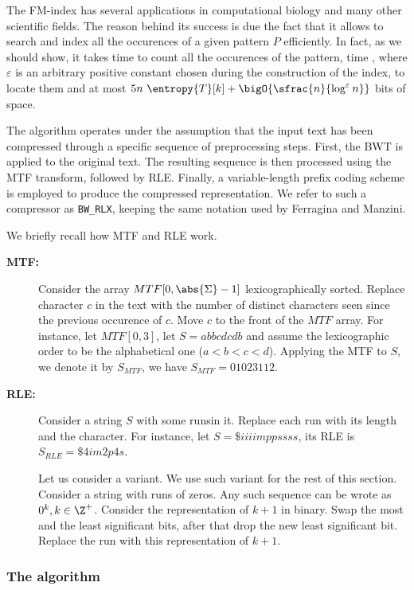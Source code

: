 \documentclass{subfiles}
\begin{document}
    The FM-index has several applications in computational biology and many other scientific fields.
        The reason behind its success is due the fact that it allows to search and index 
        all the occurences of a given pattern \(P\) efficiently. In fact, as we should show, 
        it takes time  to count all the occurences of the pattern, 
        time , where \(\varepsilon\) is an arbitrary positive constant chosen 
        during the construction of the index, to locate them and at most 
        \(5n \ \entropy{T}[k] + \bigO{\sfrac{n}{\log^{\varepsilon} n}}\) bits of space.

    The algorithm operates under the assumption that the input text has been compressed through 
        a specific sequence of preprocessing steps. First, the BWT is applied to the original text.
        The resulting sequence is then processed using the MTF transform, followed by RLE. 
        Finally, a variable-length prefix coding scheme is employed to produce the compressed representation.
        We refer to such a compressor as \lstinline{BW_RLX}, keeping the same notation used by Ferragina and Manzini.

    We briefly recall how MTF and RLE work.
    \begin{description}
        \item [\textbf{MTF:}] Consider the array \(MTF[0, \abs{\Sigma} - 1]\) lexicographically sorted. 
            Replace character \(c\) in the text with the number of distinct characters seen since the previous occurence of \(c\).
            Move \(c\) to the front of the \(MTF\) array.
            For instance, let \(MTF[0, 3]\), let \(S = abbcdcdb\) and assume the lexicographic order to be the alphabetical one
            (\(a < b < c < d\)). Applying the MTF to \(S\), we denote it by \(S_{MTF}\), we have \(S_{MTF} = 01023112\).

        \item [\textbf{RLE:}] Consider a string \(S\) with some runs\footnotemark in it.
            Replace each run with its length and the character. For instance,
            let \(S = \$iiiimppssss\), its RLE is \(S_{RLE} = \$4im2p4s\).
            
            Let us consider a variant. We use such variant for the rest of this section. 
            Consider a string with runs of zeros. Any such sequence can be wrote as \(0^{k}, k \in \Z^{+}\).
            Consider the representation of \(k + 1\) in binary. Swap the most and the least significant bits,
            after that drop the new least significant bit. Replace the run with this representation of \(k + 1\).
    \end{description}


    \subsubsection{The algorithm}
    
\end{document}
